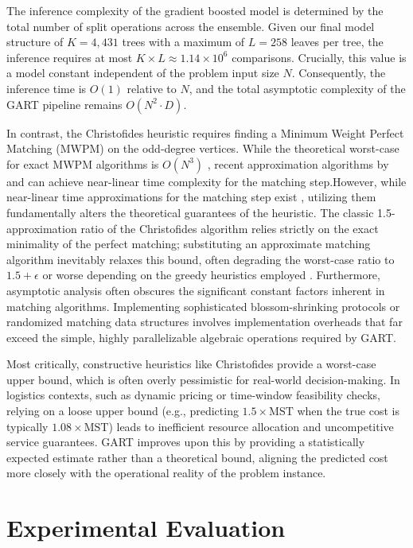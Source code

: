 \documentclass{article}
\begin{document}
The inference complexity of the gradient boosted model is determined by the total number of split operations across the ensemble. Given our final model structure of $K=4,431$ trees with a maximum of $L=258$ leaves per tree, the inference requires at most $K \times L \approx 1.14 \times 10^6$ comparisons. Crucially, this value is a model constant independent of the problem input size $N$. Consequently, the inference time is $O(1)$ relative to $N$, and the total asymptotic complexity of the GART pipeline remains $O(N^2 \cdot D)$.

In contrast, the Christofides heuristic requires finding a Minimum Weight Perfect Matching (MWPM) on the odd-degree vertices. While the theoretical worst-case for exact MWPM algorithms is $O(N^3)$ \citep{cook1999}, recent approximation algorithms by \citet{duan2014} and \citet{drake2003} can achieve near-linear time complexity for the matching step.However, while near-linear time approximations for the matching step exist \citep{duan2014}, utilizing them fundamentally alters the theoretical guarantees of the heuristic. The classic 1.5-approximation ratio of the Christofides algorithm relies strictly on the exact minimality of the perfect matching; substituting an approximate matching algorithm inevitably relaxes this bound, often degrading the worst-case ratio to $1.5 + \epsilon$ or worse depending on the greedy heuristics employed \citep{drake2003}. Furthermore, asymptotic analysis often obscures the significant constant factors inherent in matching algorithms. Implementing sophisticated blossom-shrinking protocols or randomized matching data structures involves implementation overheads that far exceed the simple, highly parallelizable algebraic operations required by GART. 

Most critically, constructive heuristics like Christofides provide a worst-case upper bound, which is often overly pessimistic for real-world decision-making. In logistics contexts, such as dynamic pricing or time-window feasibility checks, relying on a loose upper bound (e.g., predicting $1.5 \times \text{MST}$ when the true cost is typically $1.08 \times \text{MST}$) leads to inefficient resource allocation and uncompetitive service guarantees. GART improves upon this by providing a statistically expected estimate rather than a theoretical bound, aligning the predicted cost more closely with the operational reality of the problem instance.

\section{Experimental Evaluation} \label{sec:evaluation}
\end{document}
